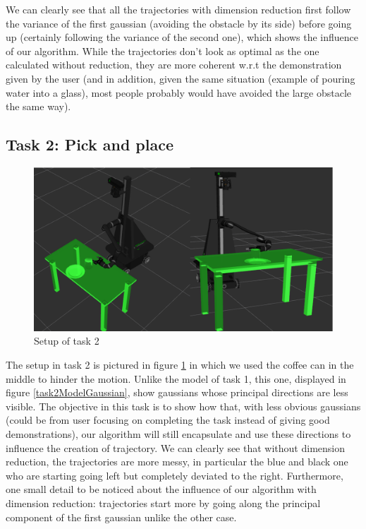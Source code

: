 \documentclass[letterpaper, 10 pt, conference]{ieeeconf}  %
\begin{document}
We can clearly see that all the trajectories with dimension reduction first follow the variance of the first gaussian (avoiding the obstacle by its side) before going up (certainly following the variance of the second one), which shows the influence of our algorithm. While the trajectories don't look as optimal as the one calculated without reduction, they are more coherent w.r.t the demonstration given by the user (and in addition, given the same situation (example of pouring water into a glass), most people probably would have avoided the large obstacle the same way). \\
\subsection{Task 2: Pick and place}
\begin{figure}[h]
	\centering
	\includegraphics[scale=0.2]{figure/task2Scenario.png}
	\caption{Setup of task 2}
	\label{task2Scenario}
\end{figure}
The setup in task 2 is pictured in figure \ref{task2Scenario} in which we used the coffee can in the middle to hinder the motion. Unlike the model of task 1, this one, displayed in figure \ref{task2ModelGaussian}, show gaussians whose principal directions are less visible. The objective in this task is to show how that, with less obvious gaussians (could be from user focusing on completing the task instead of giving good demonstrations), our algorithm will still encapsulate and use these directions to influence the creation of trajectory.
We can clearly see that without dimension reduction, the trajectories are more messy, in particular the blue and black one who are starting going left but completely deviated to the right. Furthermore, one small detail to be noticed about the influence of our algorithm with dimension reduction: trajectories start more by going along the principal component of the first gaussian unlike the other case. 
\end{document}
